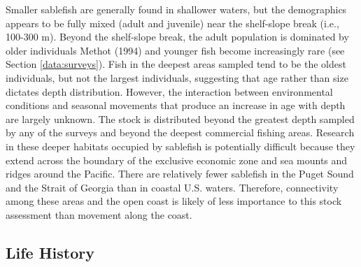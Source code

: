 \documentclass[11pt,
  english,
  a4paper,
]{article}
\begin{document}
Smaller sablefish are generally found in shallower waters, but the demographics appears to be fully mixed (adult and juvenile) near the shelf-slope break (i.e., 100-300 m). Beyond the shelf-slope break, the adult population is dominated by older individuals {Methot (1994)\leavevmode\tagmcend\tagstructend} and younger fish become increasingly rare (see Section \ref{data:surveys}). Fish in the deepest areas sampled tend to be the oldest individuals, but not the largest individuals, suggesting that age rather than size dictates depth distribution. However, the interaction between environmental conditions and seasonal movements that produce an increase in age with depth are largely unknown. The stock is distributed beyond the greatest depth sampled by any of the surveys and beyond the deepest commercial fishing areas. Research in these deeper habitats occupied by sablefish is potentially difficult because they extend across the boundary of the exclusive economic zone and sea mounts and ridges around the Pacific. There are relatively fewer sablefish in the Puget Sound and the Strait of Georgia than in coastal U.S. waters. Therefore, connectivity among these areas and the open coast is likely of less importance to this stock assessment than movement along the coast.

\leavevmode\tagmcend\tagstructend\par


\hypertarget{life-history}{%
\subsection{Life History}\label{life-history}}

\leavevmode\tagmcend\tagstructend

\end{document}
